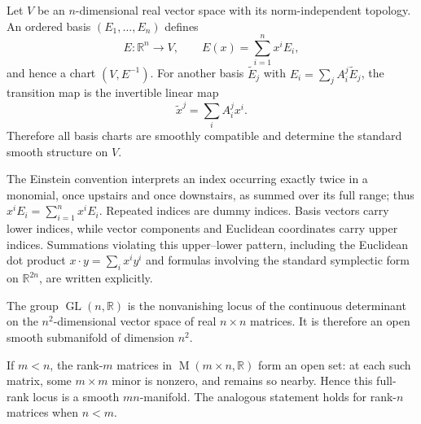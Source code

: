 \begin{example}
\label{ex:1-24}




Let $V$ be an $n$-dimensional real vector space with its norm-independent
topology. An ordered basis $(E_1,\ldots,E_n)$ defines
\[
E:\mathbb R^n\to V,\qquad E(x)=\sum_{i=1}^n x^iE_i,
\]
and hence a chart $(V,E^{-1})$. For another basis $\widetilde E_j$ with
$E_i=\sum_j A_i^j\widetilde E_j$, the transition map is the invertible linear
map
\[
\widetilde x^j=\sum_i A_i^j x^i.
\]
Therefore all basis charts are smoothly compatible and determine the standard
smooth structure on $V$.
\end{example}

\begin{notation}
\label{not:1-4-extra-1}



The Einstein convention interprets an index occurring exactly twice in a
monomial, once upstairs and once downstairs, as summed over its full range;
thus $x^iE_i=\sum_{i=1}^n x^iE_i$. Repeated indices are dummy indices. Basis
vectors carry lower indices, while vector components and Euclidean coordinates
carry upper indices. Summations violating this upper--lower pattern, including
the Euclidean dot product $x\cdot y=\sum_i x^iy^i$ and formulas involving the
standard symplectic form on $\mathbb R^{2n}$, are written explicitly.
\end{notation}

\begin{example}
\label{ex:1-27}



The group $\operatorname{GL}(n,\mathbb R)$ is the nonvanishing locus of the
continuous determinant on the $n^2$-dimensional vector space of real
$n\times n$ matrices. It is therefore an open smooth submanifold of dimension
$n^2$.
\end{example}

\begin{example}
\label{ex:1-28}




If $m<n$, the rank-$m$ matrices in
$\operatorname M(m\times n,\mathbb R)$ form an open set: at each such matrix,
some $m\times m$ minor is nonzero, and remains so nearby. Hence this full-rank
locus is a smooth $mn$-manifold. The analogous statement holds for rank-$n$
matrices when $n<m$.
\end{example}

